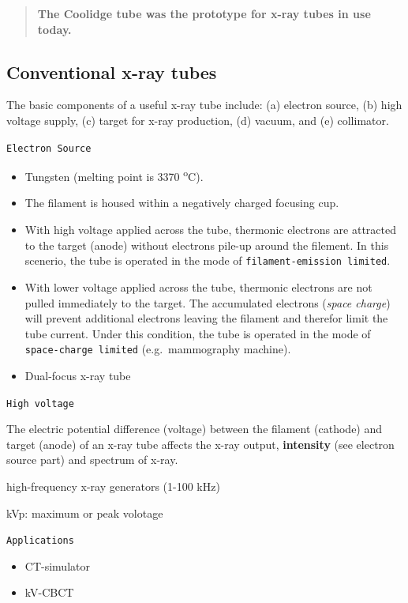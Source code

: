 \documentclass[]{book}
\providecommand{\tightlist}{%
  \setlength{\itemsep}{0pt}\setlength{\parskip}{0pt}}
\theoremstyle{definition}
\theoremstyle{definition}
\theoremstyle{definition}
\theoremstyle{remark}
\begin{document}
\begin{quote}
\textbf{The Coolidge tube was the prototype for x-ray tubes in use
today.}
\end{quote}

\subsection{Conventional x-ray tubes}\label{conventional-x-ray-tubes}

The basic components of a useful x-ray tube include: (a) electron
source, (b) high voltage supply, (c) target for x-ray production, (d)
vacuum, and (e) collimator.

\texttt{Electron\ Source}

\begin{itemize}
\tightlist
\item
  Tungsten (melting point is 3370 \textsuperscript{o}C).
\item
  The filament is housed within a negatively charged focusing cup.
\item
  With high voltage applied across the tube, thermonic electrons are
  attracted to the target (anode) without electrons pile-up around the
  filement. In this scenerio, the tube is operated in the mode of
  \texttt{filament-emission\ limited}.
\item
  With lower voltage applied across the tube, thermonic electrons are
  not pulled immediately to the target. The accumulated electrons
  (\emph{space charge}) will prevent additional electrons leaving the
  filament and therefor limit the tube current. Under this condition,
  the tube is operated in the mode of \texttt{space-charge\ limited}
  (e.g.~mammography machine).
\item
  Dual-focus x-ray tube
\end{itemize}

\texttt{High\ voltage}

The electric potential difference (voltage) between the filament
(cathode) and target (anode) of an x-ray tube affects the x-ray output,
\textbf{intensity} (see electron source part) and spectrum of x-ray.

high-frequency x-ray generators (1-100 kHz)

kVp: maximum or peak volotage

\texttt{Applications}

\begin{itemize}
\tightlist
\item
  CT-simulator
\item
  kV-CBCT
\end{itemize}
\end{document}

